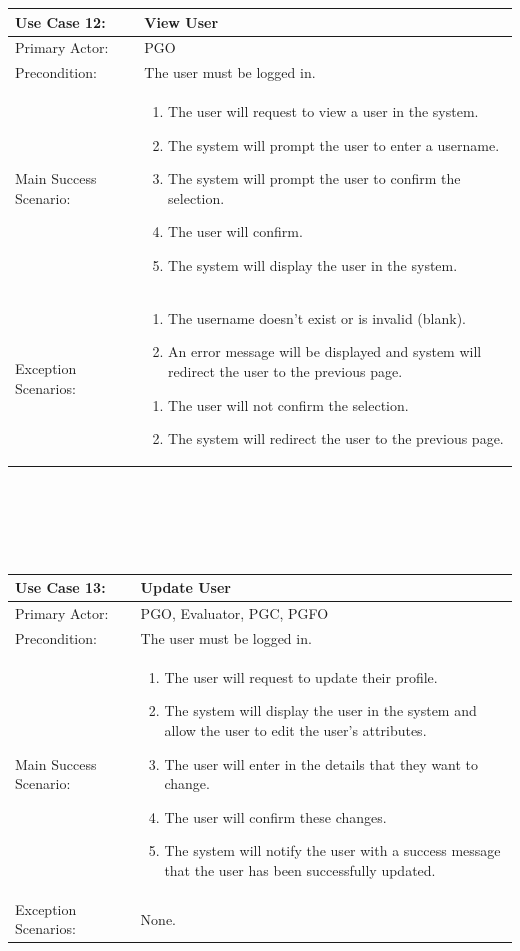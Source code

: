 \documentclass{article}
\begin{document}
\begin{tabular}{| m{5cm} | m{10cm} |}
\hline
Use Case 12: & View User \\
\hline
Primary Actor: & PGO \\
\hline
Precondition: & The user must be logged in. \\
\hline
Main Success Scenario: & \begin{enumerate} \itemsep0em \item The user will request to view a user in the system. 
\item The system will prompt the user to enter a username.
\item The system will prompt the user to confirm the selection.
\item The user will confirm.
\item The system will display the user in the system.
\end{enumerate} \\
\hline
Exception Scenarios: & \begin{enumerate} \itemsep0em \item The username doesn't exist or is invalid (blank).
\item An error message will be displayed and system will redirect the user to the previous page. \end{enumerate}
\begin{enumerate}  \itemsep0em \item The user will not confirm the selection.
\item The system will redirect the user to the previous page.
\end{enumerate} \\
\hline
\end{tabular}
\\ \\ \\ \\
\begin{tabular}{| m{5cm} | m{10cm} |}
\hline
Use Case 13: & Update User \\
\hline
Primary Actor: & PGO, Evaluator, PGC, PGFO \\
\hline
Precondition: & The user must be logged in. \\
\hline
Main Success Scenario: & \begin{enumerate} \itemsep0em \item The user will request to update their profile. 
\item The system will display the user in the system and allow the user to edit the user’s attributes.
\item The user will enter in the details that they want to change.
\item The user will confirm these changes.
\item The system will notify the user with a success message that the user has been successfully updated.
\end{enumerate} \\
\hline
Exception Scenarios: & None. \\
\hline
\end{tabular}
\end{document}
